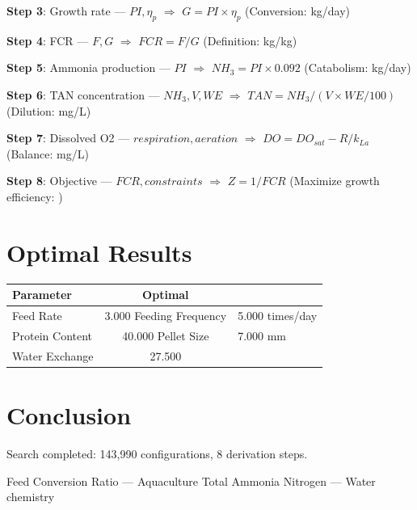 \documentclass[11pt,twocolumn]{article}
\begin{document}
\textbf{Step 3}: Growth rate --- $PI, \eta_p$ $\Rightarrow$ $G = PI \times \eta_p$ (Conversion: kg/day)


\textbf{Step 4}: FCR --- $F, G$ $\Rightarrow$ $FCR = F/G$ (Definition: kg/kg)


\textbf{Step 5}: Ammonia production --- $PI$ $\Rightarrow$ $NH_3 = PI \times 0.092$ (Catabolism: kg/day)


\textbf{Step 6}: TAN concentration --- $NH_3, V, WE$ $\Rightarrow$ $TAN = NH_3 / (V \times WE/100)$ (Dilution: mg/L)


\textbf{Step 7}: Dissolved O2 --- $respiration, aeration$ $\Rightarrow$ $DO = DO_{sat} - R/k_{La}$ (Balance: mg/L)


\textbf{Step 8}: Objective --- $FCR, constraints$ $\Rightarrow$ $Z = 1/FCR$ (Maximize growth efficiency: )


\section{Optimal Results}
\begin{table}[h]
\centering
\begin{tabular}{@{}lc@{}}
\toprule
Parameter & Optimal \\
\midrule
Feed Rate & 3.000 %
Feeding Frequency & 5.000 times/day \\
Protein Content & 40.000 %
Pellet Size & 7.000 mm \\
Water Exchange & 27.500 %
\bottomrule
\end{tabular}
\end{table}

\section{Conclusion}
Search completed: 143,990 configurations, 8 derivation steps.

\begin{thebibliography}{9}
 Feed Conversion Ratio --- Aquaculture
 Total Ammonia Nitrogen --- Water chemistry
\end{thebibliography}
\end{document}
